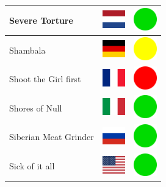 \documentclass[12pt, a4paper, twoside]{report}
\begin{document}
\begin{center}
\begin{longtable}{|p{5cm}|p{2cm}|p{2cm}|}
			Severe Torture & \includegraphics[width=1cm]{4x3/nl} & \includegraphics[width=1cm]{likes/y} \\ \hline
			Shambala & \includegraphics[width=1cm]{4x3/de} & \includegraphics[width=1cm]{likes/m} \\ \hline
			Shoot the Girl first & \includegraphics[width=1cm]{4x3/fr} & \includegraphics[width=1cm]{likes/n} \\ \hline
			Shores of Null & \includegraphics[width=1cm]{4x3/it} & \includegraphics[width=1cm]{likes/y} \\ \hline
			Siberian Meat Grinder & \includegraphics[width=1cm]{4x3/ru} & \includegraphics[width=1cm]{likes/y} \\ \hline
			Sick of it all & \includegraphics[width=1cm]{4x3/us} & \includegraphics[width=1cm]{likes/y} \\ \hline

\end{longtable}
\end{center}
\end{document}
